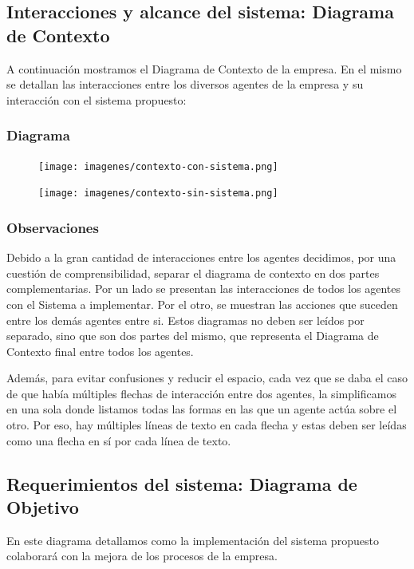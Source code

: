 \subsection{Interacciones y alcance del sistema: Diagrama de Contexto}
A continuación mostramos el Diagrama de Contexto de la empresa. En el mismo se detallan las interacciones entre los diversos agentes de la empresa y su interacción con el sistema propuesto:

\subsubsection{Diagrama}

\begin{figure}[H]
    \centering
    \texttt{[image: imagenes/contexto-con-sistema.png]}
\end{figure}

\begin{figure}[H]
    \centering
    \texttt{[image: imagenes/contexto-sin-sistema.png]}
\end{figure}

\newpage

\subsubsection{Observaciones}

Debido a la gran cantidad de interacciones entre los agentes decidimos, por una cuestión de comprensibilidad, separar el diagrama de contexto en dos partes complementarias. Por un lado se presentan las interacciones de todos los agentes con el Sistema a implementar. Por el otro, se muestran las acciones que suceden entre los demás agentes entre si. Estos diagramas no deben ser leídos por separado, sino que son dos partes del mismo, que representa el Diagrama de Contexto final entre todos los agentes.

Además, para evitar confusiones y reducir el espacio, cada vez que se daba el caso de que había múltiples flechas de interacción entre dos agentes, la simplificamos en una sola donde listamos todas las formas en las que un agente actúa sobre el otro. Por eso, hay múltiples líneas de texto en cada flecha y estas deben ser leídas como una flecha en sí por cada línea de texto.

\newpage

\subsection{Requerimientos del sistema: Diagrama de Objetivo}
En este diagrama detallamos como la implementación del sistema propuesto colaborará con la mejora de los procesos de la empresa.

